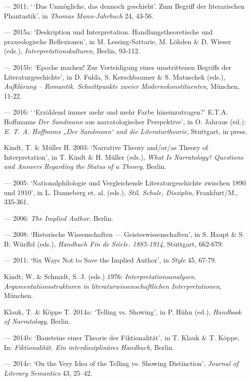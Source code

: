 \begin{hangparas}{.5cm}{1}
--- 2011: `\,`Das Unm\"ogliche, das dennoch geschieht'. Zum Begriff der literarischen Phantastik', in \emph{Thomas Mann-Jahrbuch} 24, 43-56.

--- 2015a: `Deskription und Interpretation. Handlungstheoretische und praxeologische Reflexionen', in M. Lessing-Sattarie, M. L\"ohden \& D. Wieser (eds.), \emph{Interpretationskulturen}, Berlin, 93-112.

--- 2015b: `Epoche machen! Zur Verteidigung eines umstrittenen Begriffs der Literaturgeschichte', in D. Fulda, S. Kerschbaumer \& S. Matuschek (eds.), \emph{Aufkl\"arung -- Romantik. Schnittpunkte zweier Modernekonstituenten}, M\"unchen, 11-22.

--- 2016: `\,`Erz\"ahlend immer mehr und mehr Farbe hineinzutragen?' E.T.A. Hoffmanns \emph{Der Sandmann} aus narratologischer Perspektive', in O. Jahraus (ed.): \emph{E. T. A. Hoffmnns „Der Sandmann` und die Literaturtheorie}, Stuttgart, in press.

Kindt, T. \& M\"uller H. 2003: `Narrative Theory and/or/as Theory of Interpretation', in T. Kindt \& H. M\"uller (eds.), \emph{What Is Narratology? Questions and Answers Regarding the Status of a Theory}, Berlin.

--- 2005: `Nationalphilologie und Vergleichende Literaturgeschichte zwischen 1890 und 1910', in L. Danneberg et. al. (eds.), \emph{Stil, Schule, Disziplin}, Frankfurt/M., 335-361.

--- 2006: \emph{The Implied Author}. Berlin.

--- 2008: `Historische Wissenschaften --- Geisteswissenschaften', in S. Haupt \& S. B. W\"urffel (eds.), \emph{Handbuch Fin de Si\`ecle. 1885-1914}, Stuttgart, 662-679.

--- 2011: `Six Ways Not to Save the Implied Author', in \emph{Style} 45, 67-79.

Kindt, W. \& Schmidt, S. J. (eds.) 1976: \emph{Interpretationsanalysen. Argumentationsstrukturen in literaturwissenschaftlichen Interpretationen}, M\"unchen.

Klauk, T. \& K\"oppe T. 2014a: `Telling vs. Showing', in P. H\"uhn (ed.), \emph{Handbook of Narratology}, Berlin.

--- 2014b: `Bausteine einer Theorie der Fiktionalit\"at', in T. Klauk \& T. K\"oppe, In: \emph{Fiktionalit\"at. Ein interdisziplin\"ares Handbuch}, Berlin.

--- 2014c: `On the Very Idea of the Telling vs. Showing Distinction', \emph{Journal of Literary Semantics} 43, 25--42.


\end{hangparas}
